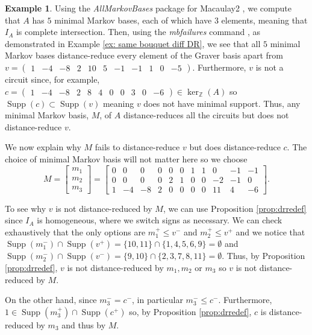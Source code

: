 \documentclass[a4paper, 12pt]{article}
\newcommand{\ZZ}{\mathbb Z}
\theoremstyle{plain}
\theoremstyle{definition}
\newtheorem{example}[theorem]{Example}
\theoremstyle{remark}
\begin{document}
\begin{example}
    Using the \textit{AllMarkovBases} package \cite{CM_2025} for Macaulay2 \cite{M2}, we compute that $A$ has $5$ minimal Markov bases, each of which have $3$ elements, meaning that $I_A$ is complete intersection. Then, using the \textit{mbfailures} command \cite{githubM2DistanceReduction},
    as demonstrated in Example \ref{ex: same bouquet diff DR}, we see that all $5$ minimal Markov bases distance-reduce every element of the Graver basis apart from $v=\begin{pmatrix}1&-4&-8&2&10&5&-1&-1&1&0&-5 \end{pmatrix}$. Furthermore, $v$ is not a circuit since, for example, $c=\begin{pmatrix}1&-4&-8&2&8&4&0&0&3&0&-6\end{pmatrix} \in \ker_\ZZ(A)$ so $\operatorname{Supp}(c) \subset \operatorname{Supp}(v)$ meaning $v$ does not have minimal support. Thus, any minimal Markov basis, $M$, of $A$ distance-reduces all the circuits but does not distance-reduce $v$.

We now explain why $M$ fails to distance-reduce $v$ but does distance-reduce $c$. The choice of minimal Markov basis will not matter here so we choose
$$M=\begin{bmatrix}m_1\\m_2\\m_3\end{bmatrix}=\begin{bmatrix}
    0&0&0&0&0&0&1&1&0&-1&-1\\
    0&0&0&0&2&1&0&0&-2&-1&0\\
    1&-4&-8&2&0&0&0&0&11&4&-6
\end{bmatrix}.$$

To see why $v$ is not distance-reduced by $M$, we can use Proposition \ref{prop:drredef} since $I_A$ is homogeneous, where we switch signs as necessary. We can check exhaustively that the only options are $m_1^+ \le v^-$ and $m_2^+ \le v^+$ and we notice that $\operatorname{Supp}(m_1^-) \cap \operatorname{Supp}(v^+)=\{10,11\} \cap \{1,4,5,6,9\}=\emptyset$ and $\operatorname{Supp}(m_2^-) \cap \operatorname{Supp}(v^-)=\{9,10\} \cap \{2,3,7,8,11\}=\emptyset$. Thus, by Proposition \ref{prop:drredef}, $v$ is not distance-reduced by $m_1,m_2$ or $m_3$ so $v$ is not distance-reduced by $M$.

On the other hand, since $m_3^- =c^-$, in particular $m_3^- \le c^-$. Furthermore, $1 \in \operatorname{Supp}(m_3^+) \cap \operatorname{Supp}(c^+)$ so, by Proposition \ref{prop:drredef}, $c$ is distance-reduced by $m_3$ and thus by $M$. %
\end{example}
\end{document}

